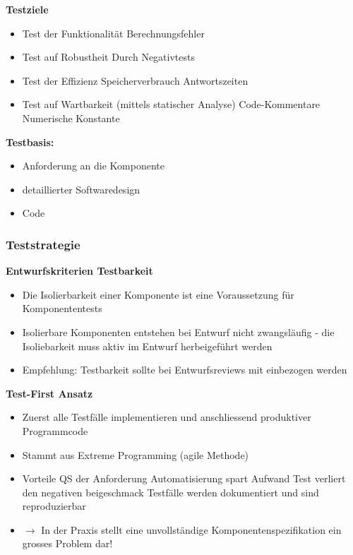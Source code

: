 \documentclass{report}
\theoremstyle{definition}
\theoremstyle{example}
\begin{document}
\textbf{Testziele}
\begin{itemize}
   \item Test der Funktionalität
   \subitem Berechnungsfehler 
   \item Test auf Robustheit
   \subitem Durch Negativtests 
   \item Test der Effizienz
   \subitem Speicherverbrauch
   \subitem Antwortszeiten 
   \item Test auf Wartbarkeit (mittels statischer Analyse)
   \subitem Code-Kommentare
   \subitem Numerische Konstante 
\end{itemize}

\textbf{Testbasis:} 
\begin{itemize}
   \item Anforderung an die Komponente
   \item detaillierter Softwaredesign
   \item Code
\end{itemize}

\subsubsection{Teststrategie}

\textbf{Entwurfskriterien Testbarkeit}
\begin{itemize}
   \item Die Isolierbarkeit einer Komponente ist eine Voraussetzung für Komponententests
   \item Isolierbare Komponenten entstehen bei Entwurf nicht zwangsläufig - die Isoliebarkeit muss aktiv im Entwurf herbeigeführt werden
   \item Empfehlung: Testbarkeit sollte bei Entwurfsreviews mit einbezogen werden
\end{itemize}

\textbf{Test-First Ansatz}
\begin{itemize}
   \item Zuerst alle Testfälle implementieren und anschliessend produktiver Programmcode
   \item Stammt aus Extreme Programming (agile Methode)
   \item Vorteile
   \subitem QS der Anforderung
   \subitem Automatisierung spart Aufwand
   \subitem Test verliert den negativen beigeschmack
   \subitem Testfälle werden dokumentiert und sind reproduzierbar
   \item $\rightarrow$ In der Praxis stellt eine unvollständige Komponentenspezifikation ein grosses Problem dar! 
\end{itemize}
\end{document}
